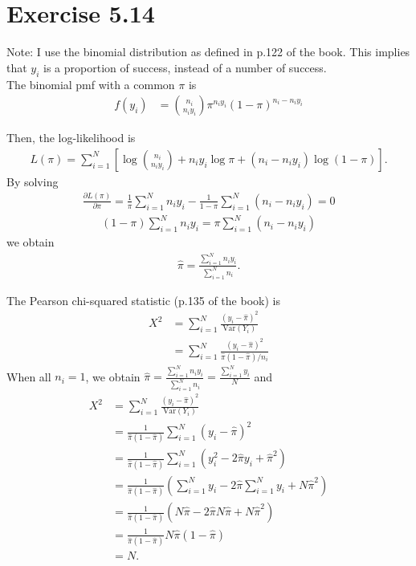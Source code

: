 \documentclass[a4paper]{article}
\newcommand{\Var}{\mathrm{Var}}
\begin{document}
\vspace{\baselineskip}
\section{Exercise 5.14}
Note: I use the binomial distribution as defined in p.122 of the book. This implies that $y_{i}$ is a proportion of success, instead of a number of success.\\

The binomial pmf with a common $\pi$ is
\begin{align*}
f(y_{i}) &= \binom{n_{i}}{n_{i}y_{i}} \pi^{n_{i}y_{i}} (1-\pi)^{n_{i}-n_{i}y_{i}}
\end{align*}

Then, the log-likelihood is
\begin{align*}
L(\pi) = \sum_{i=1}^{N} \left[\log\binom{n_{i}}{n_{i}y_i} + n_{i}y_{i}\log\pi + (n_{i} -n_{i}y_{i})\log(1-\pi)\right].
\end{align*}
By solving
\begin{align*}
\frac{\partial L(\pi)}{\partial \pi} =  \frac{1}{\pi}\sum_{i=1}^{N}n_{i}y_{i} -\frac{1}{1-\pi}\sum_{i=1}^{N}(n_{i}-n_{i}y_{i}) = 0
\end{align*}
\begin{align*}
(1-\pi)\sum_{i=1}^{N}n_{i}y_{i}  = \pi\sum_{i=1}^{N}(n_{i}-n_{i}y_{i})
\end{align*}
we obtain
\begin{align*}
\widehat{\pi} = \frac{\sum_{i=1}^{N}n_{i}y_{i}}{\sum_{i=1}^{N}n_{i}}.
\end{align*}

The Pearson chi-squared statistic (p.135 of the book) is
\begin{align*}
X^{2} &= \sum_{i=1}^{N} \frac{(y_{i} - \widehat{\pi})^{2}}{\Var(Y_{i})}\\
&= \sum_{i=1}^{N} \frac{(y_{i} - \widehat{\pi})^{2}}{\widehat{\pi}(1-\widehat{\pi})/n_{i}}
\end{align*}
When all $n_{i} = 1$, we obtain $\widehat{\pi} = \frac{\sum_{i=1}^{N}n_{i}y_{i}}{\sum_{i=1}^{N}n_{i}} = \frac{\sum_{i=1}^{N}y_{i}}{N}$ and
\begin{align*}
X^{2} &= \sum_{i=1}^{N} \frac{(y_{i} - \widehat{\pi})^{2}}{\Var(Y_{i})}\\
&= \frac{1}{\widehat{\pi}(1-\widehat{\pi})}\sum_{i=1}^{N}(y_{i} - \widehat{\pi})^{2}\\
&= \frac{1}{\widehat{\pi}(1-\widehat{\pi})}\sum_{i=1}^{N}(y_{i}^{2} -2\widehat{\pi}y_{i} + \widehat{\pi}^{2})\\
&= \frac{1}{\widehat{\pi}(1-\widehat{\pi})}\left(\sum_{i=1}^{N}y_{i} -2\widehat{\pi}\sum_{i=1}^{N}y_{i} +N\widehat{\pi}^{2}\right)\\
&= \frac{1}{\widehat{\pi}(1-\widehat{\pi})}\left(N\widehat{\pi} -2\widehat{\pi}N\widehat{\pi} +N\widehat{\pi}^{2}\right)\\
&= \frac{1}{\widehat{\pi}(1-\widehat{\pi})}N\widehat{\pi}\left(1 -\widehat{\pi}\right)\\
&= N.
\end{align*}
\end{document}

